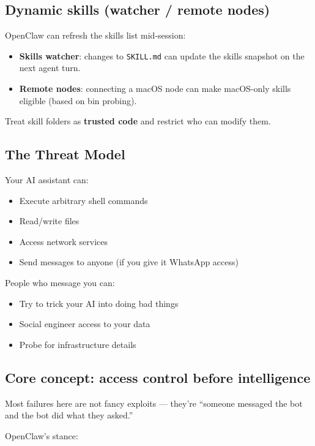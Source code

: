 \subsection{Dynamic skills (watcher / remote nodes)}


OpenClaw can refresh the skills list mid-session:

\begin{itemize}
  \item \textbf{Skills watcher}: changes to \texttt{SKILL.md} can update the skills snapshot on the next agent turn.
  \item \textbf{Remote nodes}: connecting a macOS node can make macOS-only skills eligible (based on bin probing).
\end{itemize}


Treat skill folders as \textbf{trusted code} and restrict who can modify them.

\subsection{The Threat Model}


Your AI assistant can:

\begin{itemize}
  \item Execute arbitrary shell commands
  \item Read/write files
  \item Access network services
  \item Send messages to anyone (if you give it WhatsApp access)
\end{itemize}


People who message you can:

\begin{itemize}
  \item Try to trick your AI into doing bad things
  \item Social engineer access to your data
  \item Probe for infrastructure details
\end{itemize}


\subsection{Core concept: access control before intelligence}


Most failures here are not fancy exploits — they’re “someone messaged the bot and the bot did what they asked.”

OpenClaw’s stance:

